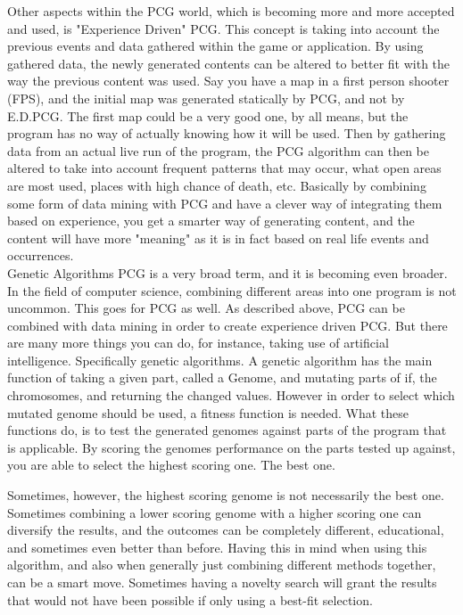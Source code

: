 Other aspects within the PCG world, which is becoming more and more accepted and used, is "Experience Driven" PCG. This concept is taking into account the previous events and data gathered within the game or application. By using gathered data, the newly generated contents can be altered to better fit with the way the previous content was used. Say you have a map in a first person shooter (FPS), and the initial map was generated statically by PCG, and not by E.D.PCG. The first map could be a very good one, by all means, but the program has no way of actually knowing how it will be used. Then by gathering data from an actual live run of the program, the PCG algorithm can then be altered to take into account frequent patterns that may occur, what open areas are most used, places with high chance of death, etc. Basically by combining some form of data mining with PCG and have a clever way of integrating them based on experience, you get a smarter way of generating content, and the content will have more "meaning" as it is in fact based on real life events and occurrences.\\

Genetic Algorithms
PCG is a very broad term, and it is becoming even broader. In the field of computer science, combining different areas into one program is not uncommon. This goes for PCG as well. As described above, PCG can be combined with data mining in order to create experience driven PCG. But there are many more things you can do, for instance, taking use of artificial intelligence. Specifically genetic algorithms. A genetic algorithm has the main function of taking a given part, called a Genome, and mutating parts of if, the chromosomes, and returning the changed values. However in order to select which mutated genome should be used, a fitness function is needed. What these functions do, is to test the generated genomes against parts of the program that is applicable. By scoring the genomes performance on the parts tested up against, you are able to select the highest scoring one. The best one. 

Sometimes, however, the highest scoring genome is not necessarily the best one. Sometimes combining a lower scoring genome with a higher scoring one can diversify the results, and the outcomes can be completely different, educational, and sometimes even better than before. Having this in mind when using this algorithm, and also when generally just combining different methods together, can be a smart move. Sometimes having a novelty search will grant the results that would not have been possible if only using a best-fit selection.

